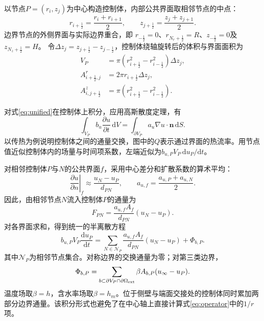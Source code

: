 以节点$P=(r_i,z_j)$为中心构造控制体，内部公共界面取相邻节点的中点：
\begin{equation}
r_{i+\frac12}=\frac{r_i+r_{i+1}}2,\qquad
z_{j+\frac12}=\frac{z_j+z_{j+1}}2.
\end{equation}
边界节点的外侧界面与实际边界重合，即
$r_{-\frac12}=0$、$r_{N_r+\frac12}=R$、$z_{-\frac12}=0$及$z_{N_z+\frac12}=H$。
令$\Delta z_j=z_{j+\frac12}-z_{j-\frac12}$，控制体绕轴旋转后的体积与界面面积为
\begin{equation}\label{eq:volume}
\begin{aligned}
V_P&=\pi\left(r_{i+\frac12}^2-r_{i-\frac12}^2\right)\Delta z_j,\\
A^r_{i+\frac12,j}&=2\pi r_{i+\frac12}\Delta z_j,\\
A^z_{i,j+\frac12}&=\pi\left(r_{i+\frac12}^2-r_{i-\frac12}^2\right).
\end{aligned}
\end{equation}

对式\eqref{eq:unified}在控制体上积分，应用高斯散度定理，有
\begin{equation}
\int_{V_P}b_u\frac{\partial u}{\partial t}\,\mathrm dV
=\int_{\partial V_P}a_u\nabla u\cdot\boldsymbol n\,\mathrm dS.
\end{equation}
以传热为例说明控制体之间的通量交换，图中的$Q$表示通过界面的热流率。用节点值近似控制体内的场量与时间项系数，左端近似为$b_{u,P}V_P\,\mathrm du_P/\mathrm dt$。

对相邻控制体$P$与$N$的公共界面$f$，采用中心差分和扩散系数的算术平均：
\begin{equation}
\left.\frac{\partial u}{\partial n}\right|_f
\approx\frac{u_N-u_P}{d_{PN}},\qquad
a_{u,f}=\frac{a_{u,P}+a_{u,N}}2.
\end{equation}
因此，由相邻节点$N$流入控制体$P$的通量为
\begin{equation}
F_{PN}=\frac{a_{u,f}A_f}{d_{PN}}(u_N-u_P).
\end{equation}
对各界面求和，得到统一的半离散方程
\begin{equation}\label{eq:fvm}
b_{u,P}V_P\frac{\mathrm du_P}{\mathrm dt}
=\sum_{N\in\mathcal N_P}
\frac{a_{u,f}A_f}{d_{PN}}(u_N-u_P)+\Phi_{b,P}.
\end{equation}
其中$\mathcal N_P$为相邻节点集合。对称边界的交换通量为零；对第三类边界，
\begin{equation}
\Phi_{b,P}=\sum_{b\subset\partial V_P\cap\partial\Omega_{\rm ext}}
\beta A_{b,P}(u_\infty-u_P).
\end{equation}
温度场取$\beta=h$，含水率场取$\beta=h_m$。位于侧壁与端面交接处的控制体同时累加两部分边界通量。该积分形式也避免了在中心轴上直接计算式\eqref{eq:operator}中的$1/r$项。

